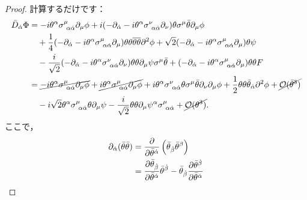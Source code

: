 \documentclass[a4paper,uplatex,dvipdfmx]{jsarticle}
\theoremstyle{definition}
\begin{document}
\begin{proof}
  計算するだけです：
  \begin{align}
    \bar{D}_{\dot{\alpha}}\Phi
    &=
    -
    i\theta^{\alpha}\sigma^{\mu}_{\ \alpha\dot{\alpha}}\partial_{\mu}\phi
    +
    i
    (
      -\partial_{\dot{\alpha}}-i\theta^{\alpha}\sigma^{\nu}_{\ \alpha\dot{\alpha}}\partial_{\nu}
    )
    \theta\sigma^{\mu}\bar{\theta}\partial_{\mu}\phi
    \nonumber
    \\
    &\quad
    +
    \frac{1}{4}
    (
      -\partial_{\dot{\alpha}}-i\theta^{\alpha}\sigma^{\mu}_{\ \alpha\dot{\alpha}}\partial_{\mu}
    )
    \theta\theta\overline{\theta\theta}\partial^2\phi
    +
    \sqrt{2}
    (
      -\partial_{\dot{\alpha}}-i\theta^{\alpha}\sigma^{\mu}_{\ \alpha\dot{\alpha}}\partial_{\mu}
    )
    \theta\psi
    \nonumber
    \\
    &\quad
    -
    \frac{i}{\sqrt{2}}
    (
      -\partial_{\dot{\alpha}}-i\theta^{\alpha}\sigma^{\nu}_{\ \alpha\dot{\alpha}}\partial_{\nu}
    )
    \theta\theta\partial_{\mu}\psi\sigma^{\mu}\bar{\theta}
    +
    (
      -\partial_{\dot{\alpha}}-i\theta^{\alpha}\sigma^{\mu}_{\ \alpha\dot{\alpha}}\partial_{\mu}
    )
    \theta\theta F
    \nonumber
    \\
    &=
    \cancel{
      -
      i\theta^{\alpha}\sigma^{\mu}_{\ \alpha\dot{\alpha}}\partial_{\mu}\phi
    }
    +
    \cancel{
      i\theta^{\alpha}\sigma^{\mu}_{\ \alpha\dot{\alpha}}\partial_{\mu}\phi
    }
    +
    i\theta^{\alpha}\sigma^{\nu}_{\ \alpha\dot{\alpha}}
    \theta\sigma^{\mu}\bar{\theta}\partial_{\nu}\partial_{\mu}\phi
    +
    \frac{1}{2}
    \theta\theta\bar{\theta}_{\dot{\alpha}}
    \partial^2\phi
    +
    \cancel{\mathcal{O}(\bar{\theta}^3)}
    \nonumber
    \\
    &\quad
    -
    i\sqrt{2}\theta^{\alpha}\sigma^{\mu}_{\ \alpha\dot{\alpha}}
    \theta\partial_{\mu}\psi
    -
    \frac{i}{\sqrt{2}}
    \theta\theta\partial_{\mu}\psi^{\alpha}\sigma^{\mu}_{\ \alpha\dot{\alpha}}
    +
    \cancel{\mathcal{O}(\theta^3)}
    .
    \label{covdiff_Phi01}
  \end{align}
  ここで，
  \begin{align}
    \partial_{\dot{\alpha}}(\bar{\theta}\bar{\theta})
    &=
    \pdv{}{\bar{\theta}^{\dot{\alpha}}}
    \left(\bar{\theta}_{\dot{\beta}}\bar{\theta}^{\beta}\right)
    \nonumber
    \\
    &=
    \pdv{\bar{\theta}_{\dot{\beta}}}{\bar{\theta}^{\dot{\alpha}}}
    \bar{\theta}^{\dot{\beta}}
    -
    \bar{\theta}_{\dot{\beta}}
    \pdv{\bar{\theta}^{\dot{\beta}}}{\bar{\theta}^{\dot{\alpha}}}

\end{align}
\end{proof}
\end{document}
